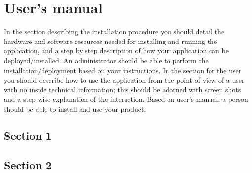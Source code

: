 \chapter{User’s manual}
\pagestyle{fancy}

In the section describing the installation procedure you should detail the hardware and software resources needed for installing and running the application, and a step by step description of how your application can be deployed/installed. An administrator should be able to perform the installation/deployment based on your instructions.
In the section for the user you should describe how to use the application from the point of view of a user with no inside technical information; this should be adorned with screen shots and a step-wise explanation of the interaction. Based on user's manual, a person should be able to install and use your product.


\section{Section 1}
\section{Section 2}

\lipsum[1-10]